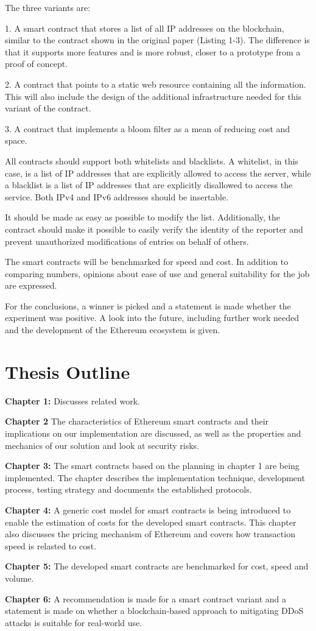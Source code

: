 The three variants are:

1. A smart contract that stores a list of all IP addresses on the blockchain, similar to the contract shown in the original paper \cite{OriginalPaper} (Listing 1-3). The difference is that it supports more features and is more robust, closer to a prototype from a proof of concept.

2. A contract that points to a static web resource containing all the information. This will also include the design of the additional infrastructure needed for this variant of the contract.

3. A contract that implements a bloom filter as a mean of reducing cost and space.

All contracts should support both whitelists and blacklists.
A whitelist, in this case, is a list of IP addresses that are explicitly allowed to access the server, while a blacklist is a list of IP addresses that are explicitly disallowed to access the service.
Both IPv4 and IPv6 addresses should be insertable.

It should be made as easy as possible to modify the list. Additionally, the contract should make it possible to easily verify the identity of the reporter and prevent unauthorized modifications of entries on behalf of others.

The smart contracts will be benchmarked for speed and cost. In addition to comparing numbers, opinions about ease of use and general suitability for the job are expressed.

For the conclusions, a winner is picked and a statement is made whether the experiment was positive. A look into the future, including further work needed and the development of the Ethereum ecosystem is given.

\section{Thesis Outline}

\textbf{Chapter 1:} Discusses related work. 

\textbf{Chapter 2} The characteristics of Ethereum smart contracts and their implications on our implementation are discussed, as well as the properties and mechanics of our solution and look at security risks.

\textbf{Chapter 3:} The smart contracts based on the planning in chapter 1 are being implemented. The chapter describes the implementation technique, development process, testing strategy and documents the established protocols.

\textbf{Chapter 4:} A generic cost model for smart contracts is being introduced to enable the estimation of costs for the developed smart contracts. This chapter also discusses the pricing mechanism of Ethereum and covers how transaction speed is relasted to cost.

\textbf{Chapter 5:} The developed smart contracts are benchmarked for cost, speed and volume. 

\textbf{Chapter 6:} A recommendation is made for a smart contract variant and a statement is made on whether a blockchain-based approach to mitigating DDoS attacks is suitable for real-world use.
